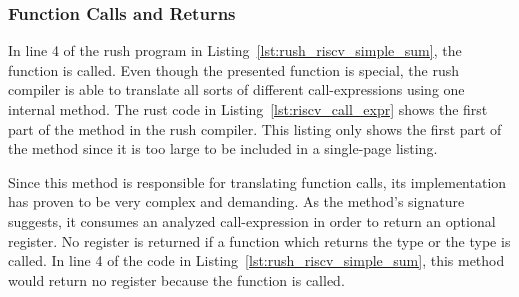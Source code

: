 \subsubsection{Function Calls and Returns}

In line 4 of the rush program in Listing~\ref{lst:rush_riscv_simple_sum}, the  function is called.
Even though the presented  function is special, the rush \riscv{} compiler is able to translate all sorts of different call-expressions using one internal method.
The rust code in Listing~\ref{lst:riscv_call_expr} shows the first part of the  method in the \riscv{} rush compiler.
This listing only shows the first part of the method since it is too large to be included in a single-page listing.


Since this method is responsible for translating function calls, its implementation has proven to be very complex and demanding.
As the method's signature suggests, it consumes an analyzed call-expression in order to return an optional register.
No register is returned if a function which returns the \qVerb{()} type or the \qVerb{!} type is called.
In line 4 of the code in Listing~\ref{lst:rush_riscv_simple_sum}, this method would return no register because the  function is called.

